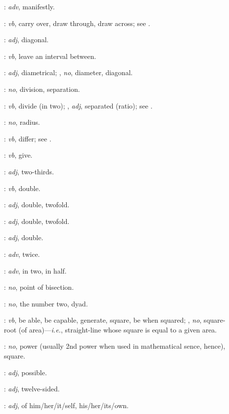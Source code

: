 {\begin{description}
\item[]: {\em adv}, manifestly.
\item[]: {\em vb}, carry over, draw through, draw across; see .
\item[]: {\em adj}, diagonal.
\item[]: {\em vb}, leave an interval between.
\item[]: {\em adj}, diametrical; , {\em no}, diameter, diagonal.
\item[]: {\em no}, division, separation.
\item[]: {\em vb}, divide (in two); , {\em adj}, separated (ratio); see .
\item[]: {\em no}, radius.
\item[]: {\em vb}, differ; see .
\item[]:
{\em vb}, give.
\item[]: {\em adj}, two-thirds.
\item[]: {\em vb}, double.
\item[]: {\em adj}, double, twofold.
\item[]: {\em adj}, double, twofold.
\item[]: {\em adj}, double.
\item[]: {\em adv}, twice.
\item[]: {\em adv}, in two, in half.
\item[]: {\em no}, point of bisection.
\item[]: {\em no}, the number two, dyad.
\item[]: {\em vb}, be able, be capable, generate, square, be when squared; , {\em no}, 
square-root (of area)---{\em i.e.}, strai\-ght-line whose square is equal to a given area.
\item[]: {\em no}, power (usually 2nd power when used in mathematical sence, hence), square.
\item[]: {\em adj}, possible.
\item[]: {\em adj}, twelve-sided.
\item[]: {\em adj}, of him/her/it/self, his/her/its/own.

\end{description}}
